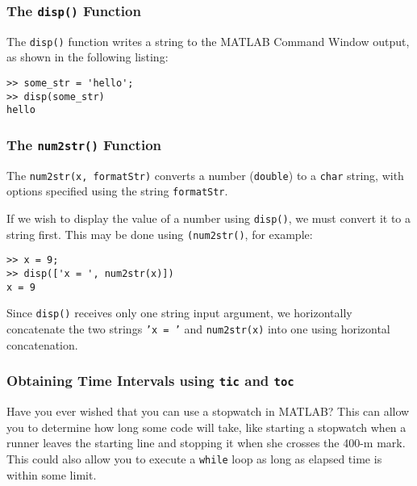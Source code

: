 \subsubsection{The \texttt{disp()} Function}
The \texttt{disp()} function writes a string to the MATLAB Command Window output, as shown in the following listing:
\begin{lstlisting}[style=Matlab-editor]
>> some_str = 'hello';
>> disp(some_str)
hello
\end{lstlisting}

\subsubsection{The \texttt{num2str()} Function}
The \texttt{num2str(x, formatStr)} converts a number (\texttt{double}) to a \texttt{char} string, with options specified using the string \texttt{formatStr}.

If we wish to display  the value of a number using \texttt{disp()}, we must convert it to a string first. This may be done using \texttt{(num2str()}, for example:
\begin{lstlisting}[style=Matlab-editor]
>> x = 9;
>> disp(['x = ', num2str(x)])
x = 9
\end{lstlisting}
Since \texttt{disp()} receives only one string input argument, we horizontally concatenate the two strings \texttt{'x = '} and \texttt{num2str(x)} into one using horizontal concatenation.

\subsubsection{Obtaining Time Intervals using \texttt{tic} and \texttt{toc}}

Have you ever wished that you can use a stopwatch in MATLAB? This can allow you to determine how long some code will take, like starting a stopwatch when a runner leaves the starting line and stopping it when she crosses the 400-m mark. This could also allow you to execute a \texttt{while} loop as long as elapsed time is within some limit.

